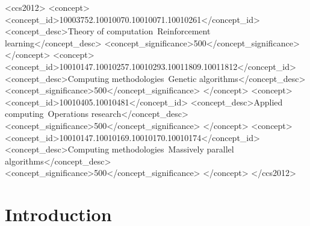 \documentclass[acmsmall]{acmart}
\begin{document}
\begin{CCSXML}
<ccs2012>
   <concept>
       <concept_id>10003752.10010070.10010071.10010261</concept_id>
       <concept_desc>Theory of computation~Reinforcement learning</concept_desc>
       <concept_significance>500</concept_significance>
       </concept>
   <concept>
       <concept_id>10010147.10010257.10010293.10011809.10011812</concept_id>
       <concept_desc>Computing methodologies~Genetic algorithms</concept_desc>
       <concept_significance>500</concept_significance>
   </concept>
   <concept>
       <concept_id>10010405.10010481</concept_id>
       <concept_desc>Applied computing~Operations research</concept_desc>
       <concept_significance>500</concept_significance>
       </concept>
   <concept>
       <concept_id>10010147.10010169.10010170.10010174</concept_id>
       <concept_desc>Computing methodologies~Massively parallel algorithms</concept_desc>
       <concept_significance>500</concept_significance>
       </concept>
 </ccs2012>
\end{CCSXML}





\maketitle

\section{Introduction}\label{sec:introduction}
\end{document}

